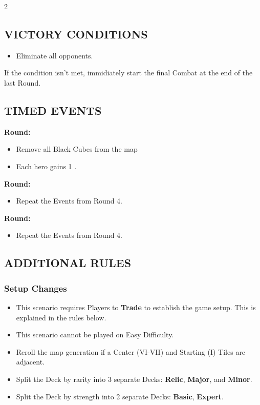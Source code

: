 \begin{multicols}{2}
\subsection*{\MakeUppercase{Victory Conditions}}
\begin{itemize}
  \item Eliminate all opponents.
\end{itemize}
If the condition isn't met, immidiately start the final Combat at the end of the last Round.

\subsection*{\MakeUppercase{Timed Events}}

\textbf{ Round:}
\begin{itemize}
  \item Remove all Black Cubes from the map
  \item Each hero gains 1 .
\end{itemize}

\textbf{ Round:}
\begin{itemize}
  \item Repeat the Events from Round 4.
\end{itemize}

\textbf{ Round:}
\begin{itemize}
  \item Repeat the Events from Round 4.
\end{itemize}
\subsection*{\MakeUppercase{Additional Rules}}

\subsubsection*{Setup Changes}
\begin{itemize}
  \item This scenario requires Players to \textbf{Trade} to establish the game setup. This is explained in the rules below.
  \item This scenario cannot be played on Easy Difficulty.
  \item Reroll the map generation if a Center (VI-VII) and Starting (I) Tiles are adjacent.
  \item Split the  Deck by rarity into 3 separate Decks: \textbf{Relic}, \textbf{Major}, and \textbf{Minor}.
  \item Split the  Deck by strength into 2 separate Decks: \textbf{Basic}, \textbf{Expert}.
\end{itemize}


\end{multicols}

